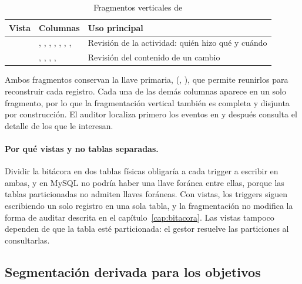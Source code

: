 \begin{table}[H]
	\centering
	\small
	\caption{Fragmentos verticales de }
	\label{tab:fragmentos-bitacora}
	\begin{tabular}{@{}L{3.4cm} L{8.2cm} L{4.2cm}@{}}
		\toprule
		\textbf{Vista} & \textbf{Columnas} & \textbf{Uso principal} \\
		\midrule
		 & , , , , , , ,  & Revisión de la actividad: quién hizo qué y cuándo \\
		 & , , , ,  & Revisión del contenido de un cambio \\
		\bottomrule
	\end{tabular}
\end{table}

Ambos fragmentos conservan la llave primaria, (, ), que permite reunirlos para reconstruir cada registro. Cada una de las demás columnas aparece en un solo fragmento, por lo que la fragmentación vertical también es completa y disjunta por construcción. El auditor localiza primero los eventos en  y después consulta el detalle de los que le interesan.

\paragraph{Por qué vistas y no tablas separadas.} Dividir la bitácora en dos tablas físicas obligaría a cada trigger a escribir en ambas, y en MySQL no podría haber una llave foránea entre ellas, porque las tablas particionadas no admiten llaves foráneas. Con vistas, los triggers siguen escribiendo un solo registro en una sola tabla, y la fragmentación no modifica la forma de auditar descrita en el capítulo~\ref{cap:bitacora}. Las vistas tampoco dependen de que la tabla esté particionada: el gestor resuelve las particiones al consultarlas.

\subsection{Segmentaci\'on derivada para los objetivos}
\label{sec:segmentacion-derivada}

